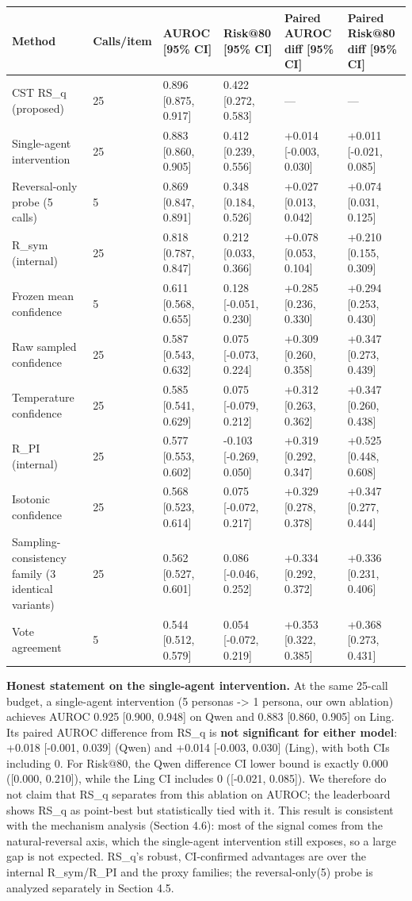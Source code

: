 \documentclass[11pt]{article}
\begin{document}
\begin{table}[t]
\centering
\small
\begin{tabular}{llllll}
\toprule
Method & Calls/item & AUROC [95\% CI] & Risk@80 [95\% CI] & Paired AUROC diff [95\% CI] & Paired Risk@80 diff [95\% CI] \\
\midrule
CST RS\_q (proposed) & 25 & 0.896 [0.875, 0.917] & 0.422 [0.272, 0.583] & — & — \\
Single-agent intervention & 25 & 0.883 [0.860, 0.905] & 0.412 [0.239, 0.556] & +0.014 [-0.003, 0.030] & +0.011 [-0.021, 0.085] \\
Reversal-only probe (5 calls) & 5 & 0.869 [0.847, 0.891] & 0.348 [0.184, 0.526] & +0.027 [0.013, 0.042] & +0.074 [0.031, 0.125] \\
R\_sym (internal) & 25 & 0.818 [0.787, 0.847] & 0.212 [0.033, 0.366] & +0.078 [0.053, 0.104] & +0.210 [0.155, 0.309] \\
Frozen mean confidence & 5 & 0.611 [0.568, 0.655] & 0.128 [-0.051, 0.230] & +0.285 [0.236, 0.330] & +0.294 [0.253, 0.430] \\
Raw sampled confidence & 25 & 0.587 [0.543, 0.632] & 0.075 [-0.073, 0.224] & +0.309 [0.260, 0.358] & +0.347 [0.273, 0.439] \\
Temperature confidence & 25 & 0.585 [0.541, 0.629] & 0.075 [-0.079, 0.212] & +0.312 [0.263, 0.362] & +0.347 [0.260, 0.438] \\
R\_PI (internal) & 25 & 0.577 [0.553, 0.602] & -0.103 [-0.269, 0.050] & +0.319 [0.292, 0.347] & +0.525 [0.448, 0.608] \\
Isotonic confidence & 25 & 0.568 [0.523, 0.614] & 0.075 [-0.072, 0.217] & +0.329 [0.278, 0.378] & +0.347 [0.277, 0.444] \\
Sampling-consistency family (3 identical variants) & 25 & 0.562 [0.527, 0.601] & 0.086 [-0.046, 0.252] & +0.334 [0.292, 0.372] & +0.336 [0.231, 0.406] \\
Vote agreement & 5 & 0.544 [0.512, 0.579] & 0.054 [-0.072, 0.219] & +0.353 [0.322, 0.385] & +0.368 [0.273, 0.431] \\
\bottomrule
\end{tabular}
\end{table}


\textbf{Honest statement on the single-agent intervention.} At the same 25-call budget, a single-agent intervention (5 personas -> 1 persona, our own ablation) achieves AUROC 0.925 [0.900, 0.948] on Qwen and 0.883 [0.860, 0.905] on Ling. Its paired AUROC difference from RS\_q is \textbf{not significant for either model}: +0.018 [-0.001, 0.039] (Qwen) and +0.014 [-0.003, 0.030] (Ling), with both CIs including 0. For Risk@80, the Qwen difference CI lower bound is exactly 0.000 ([0.000, 0.210]), while the Ling CI includes 0 ([-0.021, 0.085]). We therefore do not claim that RS\_q separates from this ablation on AUROC; the leaderboard shows RS\_q as point-best but statistically tied with it. This result is consistent with the mechanism analysis (Section 4.6): most of the signal comes from the natural-reversal axis, which the single-agent intervention still exposes, so a large gap is not expected. RS\_q's robust, CI-confirmed advantages are over the internal R\_sym/R\_PI and the proxy families; the reversal-only(5) probe is analyzed separately in Section 4.5.
\end{document}
